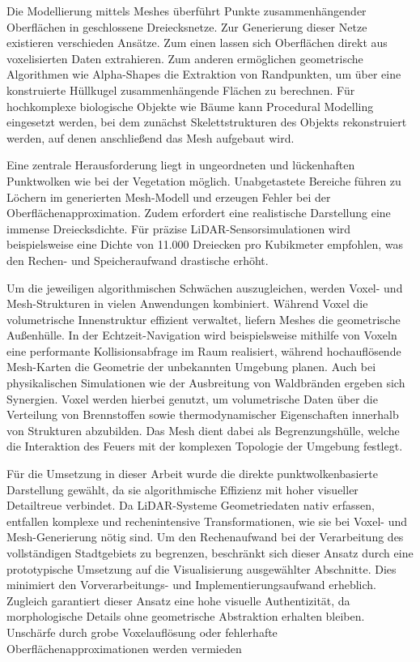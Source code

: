 Die Modellierung mittels Meshes überführt Punkte zusammenhängender Oberflächen in geschlossene Dreiecksnetze. Zur Generierung dieser Netze existieren verschieden Ansätze. Zum einen lassen sich Oberflächen direkt aus voxelisierten Daten extrahieren. \citep{chengRealTimeLiDARInertial2024} Zum anderen ermöglichen geometrische Algorithmen wie Alpha-Shapes die Extraktion von Randpunkten, um über eine konstruierte Hüllkugel zusammenhängende Flächen zu berechnen. \citep{wangAutomatedPhenotypicTrait2024} Für hochkomplexe biologische Objekte wie Bäume kann Procedural Modelling eingesetzt werden, bei dem zunächst Skelettstrukturen des Objekts rekonstruiert werden, auf denen anschließend das Mesh aufgebaut wird. \citep{keerthinathanModellingLiDARBasedVegetation2025}

Eine zentrale Herausforderung liegt in ungeordneten und lückenhaften Punktwolken wie bei der Vegetation möglich. Unabgetastete Bereiche führen zu Löchern im generierten Mesh-Modell und erzeugen Fehler bei der Oberflächenapproximation. \citep{chengRealTimeLiDARInertial2024} Zudem erfordert eine realistische Darstellung eine immense Dreiecksdichte. Für präzise LiDAR-Sensorsimulationen wird beispielsweise eine Dichte von 11.000 Dreiecken pro Kubikmeter empfohlen, was den Rechen- und Speicheraufwand drastische erhöht. \citep{goodinGeometricFidelityRequirements2024}

Um die jeweiligen algorithmischen Schwächen auszugleichen, werden Voxel- und Mesh-Strukturen in vielen Anwendungen kombiniert. Während Voxel die volumetrische Innenstruktur effizient verwaltet, liefern Meshes die geometrische Außenhülle. In der Echtzeit-Navigation wird beispielsweise mithilfe von Voxeln eine performante Kollisionsabfrage im Raum realisiert, während hochauflösende Mesh-Karten die Geometrie der unbekannten Umgebung planen. \citep{chengRealTimeLiDARInertial2024} Auch bei physikalischen Simulationen wie der Ausbreitung von Waldbränden ergeben sich Synergien. Voxel werden hierbei genutzt, um volumetrische Daten über die Verteilung von Brennstoffen sowie thermodynamischer Eigenschaften innerhalb von Strukturen abzubilden. Das Mesh dient dabei als Begrenzungshülle, welche die Interaktion des Feuers mit der komplexen Topologie der Umgebung festlegt. \citep{goodinGeometricFidelityRequirements2024}

Für die Umsetzung in dieser Arbeit wurde die direkte punktwolkenbasierte Darstellung gewählt, da sie algorithmische Effizienz mit hoher visueller Detailtreue verbindet. Da LiDAR-Systeme Geometriedaten nativ erfassen, entfallen komplexe und rechenintensive Transformationen, wie sie bei Voxel- und Mesh-Generierung nötig sind. Um den Rechenaufwand bei der Verarbeitung des vollständigen Stadtgebiets zu begrenzen, beschränkt sich dieser Ansatz durch eine prototypische Umsetzung auf die Visualisierung ausgewählter Abschnitte. Dies minimiert den Vorverarbeitungs- und Implementierungsaufwand erheblich. Zugleich garantiert dieser Ansatz eine hohe visuelle Authentizität, da morphologische Details ohne geometrische Abstraktion erhalten bleiben. Unschärfe durch grobe Voxelauflösung oder fehlerhafte Oberflächenapproximationen werden vermieden